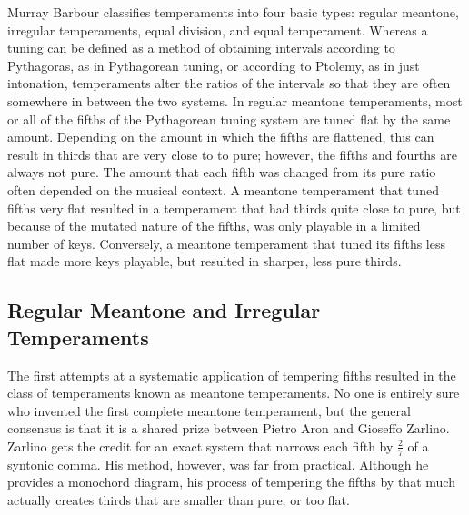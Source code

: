 Murray Barbour classifies temperaments into four basic types: regular meantone, irregular
temperaments, equal division, and equal temperament. Whereas a tuning can be defined as a
method of obtaining intervals according to Pythagoras, as in Pythagorean tuning, or
according to Ptolemy, as in just intonation, temperaments alter the ratios of the
intervals so that they are often somewhere in between the two systems. In regular meantone
temperaments, most or all of the fifths of the Pythagorean tuning system are tuned flat by
the same amount.  Depending on the amount in which the fifths are flattened, this can
result in thirds that are very close to to pure; however, the fifths and fourths are
always not pure.  The amount that each fifth was changed from its pure ratio often
depended on the musical context.  A meantone temperament that tuned fifths very flat
resulted in a temperament that had thirds quite close to pure, but because of the mutated
nature of the fifths, was only playable in a limited number of keys.  Conversely, a
meantone temperament that tuned its fifths less flat made more keys playable, but resulted
in sharper, less pure thirds.

\subsection{Regular Meantone and Irregular Temperaments}

The first attempts at a systematic application of tempering fifths resulted in the class
of temperaments known as meantone temperaments.  No one is entirely sure who invented the
first complete meantone temperament, but the general consensus is that it is a shared
prize between Pietro Aron and Gioseffo Zarlino. Zarlino gets the credit for an exact
system that narrows each fifth by $\frac{2}{7}$ of a syntonic comma.  His method, however,
was far from practical.  Although he provides a monochord diagram, his process of
tempering the fifths by that much actually creates thirds that are smaller than pure, or
too flat.

